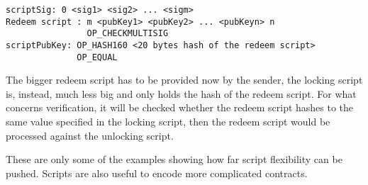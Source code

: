 \begin{itemize}[leftmargin=*]
\begin{lstlisting}[frame=single]
scriptSig: 0 <sig1> <sig2> ... <sigm>
Redeem script : m <pubKey1> <pubKey2> ... <pubKeyn> n 
                OP_CHECKMULTISIG 
scriptPubKey: OP_HASH160 <20 bytes hash of the redeem script> 
              OP_EQUAL
\end{lstlisting}
The bigger redeem script has to be provided now by the sender, the locking script is, instead, much less big and only holds the hash of the redeem script. For what concerns verification, it will be checked whether the redeem script hashes to the same value specified in the locking script, then the redeem script would be processed against the unlocking script.
\end{itemize}
These are only some of the examples showing how far script flexibility can be pushed. Scripts are also useful to encode more complicated contracts.